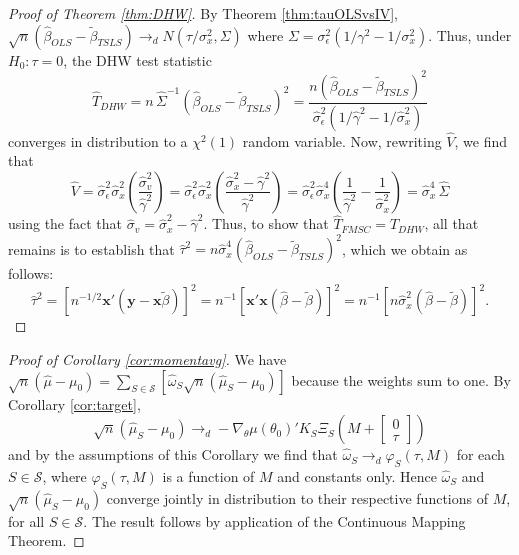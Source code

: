 \begin{proof}[Proof of Theorem \ref{thm:DHW}] 
By Theorem \ref{thm:tauOLSvsIV}, $\sqrt{n}(\widehat{\beta}_{OLS} - \widetilde{\beta}_{TSLS}) \rightarrow_d N\left(\tau/\sigma_x^2, \Sigma \right)$
where $\Sigma =  \sigma_\epsilon^2 \left(1/\gamma^2 - 1/\sigma_x^2 \right)$.
Thus, under $H_0 \colon \tau = 0$, the DHW test statistic 
$$\widehat{T}_{DHW} = n\, \widehat{\Sigma}^{-1}(\widehat{\beta}_{OLS} - \widetilde{\beta}_{TSLS})^2 = \frac{n(\widehat{\beta}_{OLS} - \widetilde{\beta}_{TSLS})^2}{ \widehat{\sigma}_\epsilon^2 \left(1/\widehat{\gamma}^2 - 1/\widehat{\sigma}_x^2 \right)}$$
converges in distribution to a $\chi^2(1)$ random variable. 
Now, rewriting $\widehat{V}$, we find that
$$\widehat{V} = \widehat{\sigma}_\epsilon^2 \widehat{\sigma}_x^2\left(\frac{\widehat{\sigma}_v^2 }{\widehat{\gamma}^2}\right) = \widehat{\sigma}_\epsilon^2 \widehat{\sigma}_x^2\left(\frac{\widehat{\sigma}_x^2 - \widehat{\gamma}^2 }{\widehat{\gamma}^2}\right) = \widehat{\sigma}_\epsilon^2 \widehat{\sigma}_x^4\left(\frac{1}{\widehat{\gamma}^2} - \frac{1}{\widehat{\sigma}_x^2}\right) = \widehat{\sigma}_x^4 \,\widehat{\Sigma}$$
using the fact that $\widehat{\sigma}_v = \widehat{\sigma}_x^2 - \widehat{\gamma}^2$. 
Thus, to show that $\widehat{T}_{FMSC} = \widehat{T}_{DHW}$, all that remains is to establish that $\widehat{\tau}^2 = n\widehat{\sigma}_x^4 (\widehat{\beta}_{OLS} - \widetilde{\beta}_{TSLS})^2$, which we obtain as follows:
    $$\widehat{\tau}^2  =  \left[n^{-1/2} \textbf{x}'(\mathbf{y} - \mathbf{x}\widetilde{\beta})\right]^2 = n^{-1}\left[\mathbf{x}'\mathbf{x} \left( \widehat{\beta} - \widetilde{\beta}\right) \right]^2 = n^{-1}\left[n \widehat{\sigma}_x^2 \left( \widehat{\beta} - \widetilde{\beta}\right) \right]^2.$$
\end{proof}

\begin{proof}[Proof of Corollary \ref{cor:momentavg}]
We have
		$\sqrt{n}\left(\widehat{\mu} - \mu_0\right) = \sum_{S \in \mathscr{S}}\left[ \widehat{\omega}_S \sqrt{n}\left(\widehat{\mu}_S - \mu_0\right)\right]$
because the weights sum to one.
By Corollary \ref{cor:target}, 
$$\sqrt{n}\left(\widehat{\mu}_S - \mu_0\right)\rightarrow_d-\nabla_\theta\mu(\theta_0)'K_S \Xi_S \left(M +  \left[\begin{array}
	{c} 0 \\ \tau
\end{array} \right]\right)$$
and by the assumptions of this Corollary we find that $\widehat{\omega}_S \rightarrow_d\varphi_S(\tau,M)$ for each $S\in \mathscr{S}$, where $\varphi_S(\tau,M)$ is a function of $M$ and constants only. 
Hence $\widehat{\omega}_S$ and $\sqrt{n}\left(\widehat{\mu}_S - \mu_0\right)$ converge jointly in distribution to their respective functions of $M$, for all $S \in \mathscr{S}$. 
The result follows by application of the Continuous Mapping Theorem.
\end{proof}


